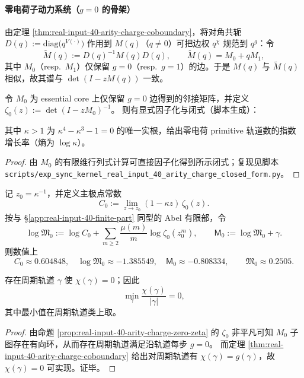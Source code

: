 \paragraph{零电荷子动力系统（$g=0$ 的骨架）}
由定理 \ref{thm:real-input-40-arity-charge-coboundary}，将对角共轭
\(
D(q):=\mathrm{diag}\bigl(q^{V(\cdot)}\bigr)
\)
作用到 $M(q)$（$q\neq 0$）可把边权 $q^{\chi}$ 规范到 $q^{g}$：令
\[
\widetilde M(q):=D(q)^{-1}M(q)D(q),
\qquad
\widetilde M(q)=M_0+qM_1,
\]
其中 $M_0$（resp.\ $M_1$）仅保留 $g=0$（resp.\ $g=1$）的边。于是 $M(q)$ 与 $\widetilde M(q)$ 相似，故其谱与 $\det(I-zM(q))$ 一致。

\begin{proposition}\label{prop:real-input-40-arity-charge-zero-zeta}
令 $M_0$ 为 essential core 上仅保留 $g=0$ 边得到的邻接矩阵，并定义
\(
\zeta_0(z):=\det(I-zM_0)^{-1}
\)。
则有显式因子化与闭式（脚本生成）：

其中 $\kappa>1$ 为 $\kappa^4-\kappa^3-1=0$ 的唯一实根，给出零电荷 primitive 轨道数的指数增长率（熵为 $\log\kappa$）。
\end{proposition}

\begin{proof}
由 $M_0$ 的有限维行列式计算可直接因子化得到所示闭式；复现见脚本
\texttt{scripts/exp\_sync\_kernel\_real\_input\_40\_arity\_charge\_closed\_form.py}。
\end{proof}

\begin{proposition}\label{prop:real-input-40-arity-charge-zero-constants}
记 $z_0=\kappa^{-1}$，并定义主极点常数
\[
C_0:=\lim_{z\to z_0}(1-\kappa z)\,\zeta_0(z).
\]
按与 \S\ref{app:real-input-40-finite-part} 同型的 Abel 有限部，令
\[
\log\mathfrak{M}_0:=\log C_0+\sum_{m\ge 2}\frac{\mu(m)}{m}\log\zeta_0(z_0^m),
\qquad
\mathsf{M}_0:=\log\mathfrak{M}_0+\gamma.
\]
则数值上
\[
C_0\approx 0.604848,\quad
\log\mathfrak{M}_0\approx -1.385549,\quad
\mathsf{M}_0\approx -0.808334,
\qquad
\mathfrak{M}_0\approx 0.2505.
\]
\end{proposition}

\begin{corollary}\label{cor:real-input-40-arity-charge-min-average}
存在周期轨道 $\gamma$ 使 $\chi(\gamma)=0$；因此
\[
\min_{\gamma}\frac{\chi(\gamma)}{|\gamma|}=0,
\]
其中最小值在周期轨道类上取。
\end{corollary}

\begin{proof}
由命题 \ref{prop:real-input-40-arity-charge-zero-zeta} 的 $\zeta_0$ 非平凡可知 $M_0$ 子图存在有向环，从而存在周期轨道满足沿轨道每步 $g=0$。
而定理 \ref{thm:real-input-40-arity-charge-coboundary} 给出对周期轨道有 $\chi(\gamma)=g(\gamma)$，故 $\chi(\gamma)=0$ 可实现。证毕。
\end{proof}

